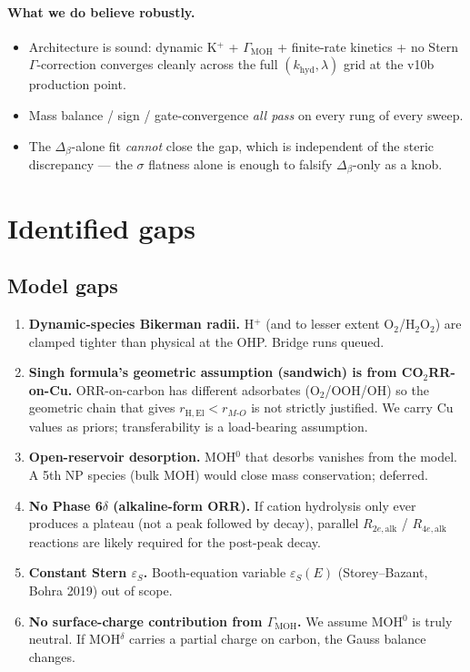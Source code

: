 \documentclass[11pt]{article}
\begin{document}
\paragraph{What we do believe robustly.}
\begin{itemize}[leftmargin=*,nosep]
\item Architecture is sound: dynamic K$^+$ + $\Gamma_{\mathrm{MOH}}$ +
  finite-rate kinetics + no Stern $\Gamma$-correction converges
  cleanly across the full $(k_{\mathrm{hyd}},\lambda)$ grid at the
  v10b production point.
\item Mass balance / sign / gate-convergence \emph{all pass} on
  every rung of every sweep.
\item The $\Delta_\beta$-alone fit \emph{cannot} close the gap, which
  is independent of the steric discrepancy --- the $\sigma$ flatness
  alone is enough to falsify $\Delta_\beta$-only as a knob.
\end{itemize}

\section{Identified gaps}
\label{sec:gaps}

\subsection{Model gaps}

\begin{enumerate}[leftmargin=*,nosep]
\item \textbf{Dynamic-species Bikerman radii.}  H$^+$ (and to lesser
  extent O$_2$/H$_2$O$_2$) are clamped tighter than physical at the OHP.
  Bridge runs queued.
\item \textbf{Singh formula's geometric assumption (sandwich) is from CO$_2$RR-on-Cu.}
  ORR-on-carbon has different adsorbates (O$_2$/OOH/OH) so the
  geometric chain that gives $r_{\mathrm{H,El}}<r_{M\text{-}O}$ is
  not strictly justified.  We carry Cu values as priors; transferability
  is a load-bearing assumption.
\item \textbf{Open-reservoir desorption.}  MOH$^0$ that desorbs vanishes
  from the model.  A 5th NP species (bulk MOH) would close mass
  conservation; deferred.
\item \textbf{No Phase 6$\delta$ (alkaline-form ORR).}  If cation
  hydrolysis only ever produces a plateau (not a peak followed by
  decay), parallel $R_{2e,\mathrm{alk}}$ / $R_{4e,\mathrm{alk}}$
  reactions are likely required for the post-peak decay.
\item \textbf{Constant Stern $\varepsilon_S$.}  Booth-equation variable
  $\varepsilon_S(E)$ (Storey--Bazant, Bohra 2019) out of scope.
\item \textbf{No surface-charge contribution from $\Gamma_{\mathrm{MOH}}$.}
  We assume MOH$^0$ is truly neutral.  If MOH$^{\delta}$ carries a partial charge
  on carbon, the Gauss balance changes.
\end{enumerate}
\end{document}
